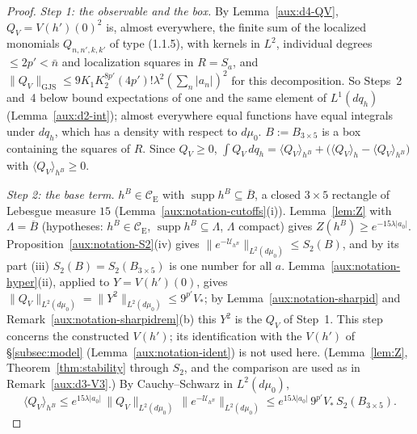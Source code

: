 \documentclass[11pt,a4paper]{article}
\theoremstyle{plain}
\theoremstyle{definition}
\theoremstyle{plain}
\theoremstyle{definition}
\newcommand{\CE}{\mathcal{C}_{\mathrm E}}
\DeclareMathOperator{\supp}{supp}
\newcommand{\GJS}[1]{\lVert #1\rVert_{\mathrm{GJS}}}   %
\newcommand{\ev}[2]{\langle #1\rangle_{#2}}            %
\newcommand{\Uc}{\mathcal U}
\newcommand{\dmu}{d\mu_0}
\begin{document}
\begin{proof}
\emph{Step 1: the observable and the box.}  By Lemma~\ref{aux:d4-QV}, $Q_V=V(h')(0)^2$ is, almost
everywhere, the finite sum of the localized monomials $Q_{n,n',k,k'}$ of type (1.1.5), with kernels
in $L^2$, individual degrees $\le2p'<\bar n$ and localization squares in $R=S_a$, and
$\GJS{Q_V}\le9K_1K_2^{8p'}(4p')!\lambda^2(\sum_n|a_n|)^2$ for this decomposition.  So Steps~2 and~4
below bound expectations of one and the same element of $L^1(dq_h)$ (Lemma~\ref{aux:d2-int});
almost everywhere equal functions have equal integrals under $dq_h$, which has a density with
respect to $\dmu$.  $B:=B_{3\times5}$ is a box containing the squares of $R$.  Since $Q_V\ge0$,
$\int Q_V\,dq_h=\ev{Q_V}{h^B}+\bigl(\ev{Q_V}{h}-\ev{Q_V}{h^B}\bigr)$ with $\ev{Q_V}{h^B}\ge0$.

\emph{Step 2: the base term.}  $h^B\in\CE$ with $\supp h^B\subseteq\overline B$, a closed $3\times5$
rectangle of Lebesgue measure $15$ (Lemma~\ref{aux:notation-cutoffs}(i)).  Lemma~\ref{lem:Z}
with $\Lambda=\overline B$ (hypotheses: $h^B\in\CE$, $\supp h^B\subseteq\Lambda$, $\Lambda$
compact) gives $Z(h^B)\ge e^{-15\lambda|a_0|}$.  Proposition~\ref{aux:notation-S2}(iv) gives
$\|e^{-\Uc_{h^B}}\|_{L^2(\dmu)}\le S_2(B)$, and by its part (iii) $S_2(B)=S_2(B_{3\times5})$ is one
number for all $a$.  Lemma~\ref{aux:notation-hyper}(ii), applied to $Y=V(h')(0)$, gives
$\|Q_V\|_{L^2(\dmu)}=\|Y^2\|_{L^2(\dmu)}\le9^{p'}V_*$; by Lemma~\ref{aux:notation-sharpid} and
Remark~\ref{aux:notation-sharpidrem}(b) this $Y^2$ is the $Q_V$ of Step~1.  This step concerns
the constructed $V(h')$; its identification with the $V(h')$ of \S\ref{subsec:model}
(Lemma~\ref{aux:notation-ident}) is not used here.  (Lemma~\ref{lem:Z},
Theorem~\ref{thm:stability} through $S_2$, and the comparison are used as in
Remark~\ref{aux:d3-V3}.)  By Cauchy--Schwarz in
$L^2(\dmu)$,
\[
 \ev{Q_V}{h^B}\le e^{15\lambda|a_0|}\,\|Q_V\|_{L^2(\dmu)}\,\|e^{-\Uc_{h^B}}\|_{L^2(\dmu)}
 \le e^{15\lambda|a_0|}\,9^{p'}V_*\,S_2(B_{3\times5}) .
\]


\end{proof}
\end{document}
